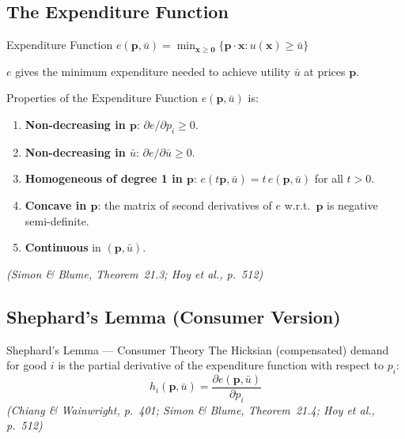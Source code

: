 \documentclass[12pt, a4paper]{article}
\theoremstyle{definition}
\newcommand{\bx}{\mathbf{x}}
\newcommand{\bp}{\mathbf{p}}
\newcommand{\bz}{\mathbf{0}}
\newcommand{\pp}[2]{\dfrac{\partial #1}{\partial #2}}
\begin{document}
\subsection{The Expenditure Function}

\begin{defbox}{Expenditure Function}
$e(\bp, \bar u) = \min_{\bx\geq\bz}\{\bp\cdot\bx : u(\bx)\geq \bar u\}$

$e$ gives the minimum expenditure needed to achieve utility $\bar u$ at
prices $\bp$.
\end{defbox}

\begin{thmbox}{Properties of the Expenditure Function}
$e(\bp,\bar u)$ is:
\begin{enumerate}
  \item \textbf{Non-decreasing in $\bp$}: $\partial e/\partial p_i \geq 0$.
  \item \textbf{Non-decreasing in $\bar u$}: $\partial e/\partial \bar u \geq 0$.
  \item \textbf{Homogeneous of degree 1 in $\bp$}:
        $e(t\bp,\bar u) = t\,e(\bp,\bar u)$ for all $t>0$.
  \item \textbf{Concave in $\bp$}: the matrix of second derivatives of $e$
        w.r.t.\ $\bp$ is negative semi-definite.
  \item \textbf{Continuous} in $(\bp,\bar u)$.
\end{enumerate}
\emph{(Simon \& Blume, Theorem~21.3; Hoy et al., p.\ 512)}
\end{thmbox}

\subsection{Shephard's Lemma (Consumer Version)}

\begin{thmbox}{Shephard's Lemma --- Consumer Theory}
The Hicksian (compensated) demand for good $i$ is the partial derivative of
the expenditure function with respect to $p_i$:
\[
  h_i(\bp,\bar u) = \pp{e(\bp,\bar u)}{p_i}
\]
\emph{(Chiang \& Wainwright, p.\ 401; Simon \& Blume, Theorem~21.4;
Hoy et al., p.\ 512)}
\end{thmbox}
\end{document}
